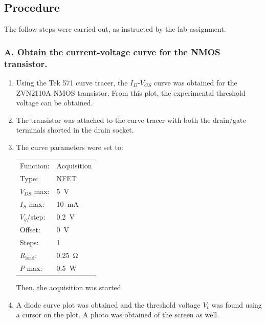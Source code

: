 \documentclass{report}
\begin{document}
\subsection{Procedure}
The follow steps were carried out, as instructed by the lab assignment.

\subsubsection{A. Obtain the current-voltage curve for the NMOS transistor.}
\begin{enumerate}
	\item Using the Tek 571 curve tracer, the $I_D$-$V_{GS}$ curve was obtained for the ZVN2110A NMOS transistor. From this plot, the experimental threshold voltage can be obtained.
	\item The transistor was attached to the curve tracer with both the drain/gate terminals shorted in the drain socket.
	\item The curve parameters were set to:
	
	\begin{tabular}{ll}
		Function: & Acquisition \\
		Type: & NFET \\
		$V_{DS}$ max: & \SI{5}{\V} \\
		$I_S$ max: & \SI{10}{\mA} \\
		$V_g$/step: & \SI{0.2}{\V} \\
		Offset: & \SI{0}{\V} \\
		Steps: & 1 \\
		$R_\mathrm{load}$: & \SI{0.25}{\ohm} \\
		$P$ max: & \SI{0.5}{\W}
	\end{tabular}

	Then, the acquisition was started.
	\item A diode curve plot was obtained and the threshold voltage $V_t$ was found using a cursor on the plot. A photo was obtained of the screen as well.
\end{enumerate}
\end{document}
